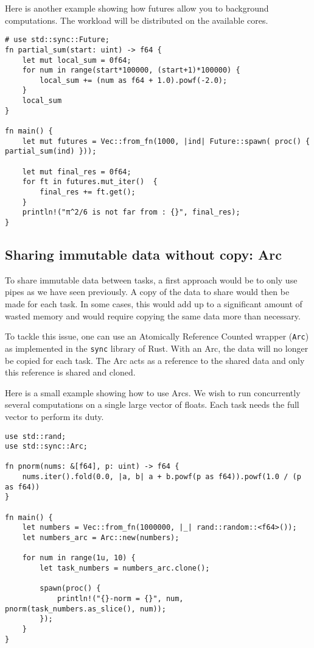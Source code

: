 \documentclass[]{article}
\begin{document}
Here is another example showing how futures allow you to background
computations. The workload will be distributed on the available cores.

\begin{verbatim}
# use std::sync::Future;
fn partial_sum(start: uint) -> f64 {
    let mut local_sum = 0f64;
    for num in range(start*100000, (start+1)*100000) {
        local_sum += (num as f64 + 1.0).powf(-2.0);
    }
    local_sum
}

fn main() {
    let mut futures = Vec::from_fn(1000, |ind| Future::spawn( proc() { partial_sum(ind) }));

    let mut final_res = 0f64;
    for ft in futures.mut_iter()  {
        final_res += ft.get();
    }
    println!("π^2/6 is not far from : {}", final_res);
}
\end{verbatim}

\subsection{Sharing immutable data without copy:
Arc}\label{sharing-immutable-data-without-copy-arc}

To share immutable data between tasks, a first approach would be to only
use pipes as we have seen previously. A copy of the data to share would
then be made for each task. In some cases, this would add up to a
significant amount of wasted memory and would require copying the same
data more than necessary.

To tackle this issue, one can use an Atomically Reference Counted
wrapper (\texttt{Arc}) as implemented in the \texttt{sync} library of
Rust. With an Arc, the data will no longer be copied for each task. The
Arc acts as a reference to the shared data and only this reference is
shared and cloned.

Here is a small example showing how to use Arcs. We wish to run
concurrently several computations on a single large vector of floats.
Each task needs the full vector to perform its duty.

\begin{verbatim}
use std::rand;
use std::sync::Arc;

fn pnorm(nums: &[f64], p: uint) -> f64 {
    nums.iter().fold(0.0, |a, b| a + b.powf(p as f64)).powf(1.0 / (p as f64))
}

fn main() {
    let numbers = Vec::from_fn(1000000, |_| rand::random::<f64>());
    let numbers_arc = Arc::new(numbers);

    for num in range(1u, 10) {
        let task_numbers = numbers_arc.clone();

        spawn(proc() {
            println!("{}-norm = {}", num, pnorm(task_numbers.as_slice(), num));
        });
    }
}
\end{verbatim}
\end{document}
